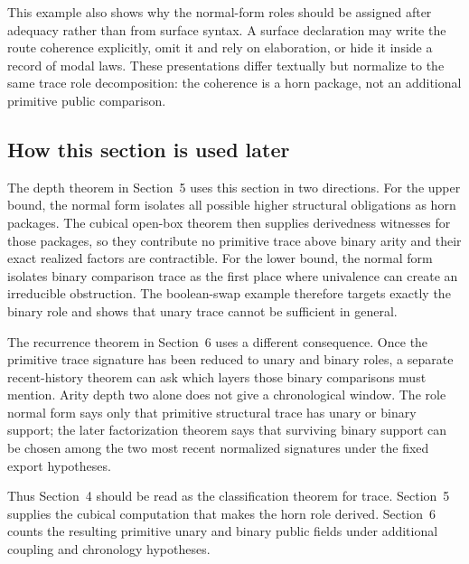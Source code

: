 This example also shows why the normal-form roles should be assigned after adequacy rather
than from surface syntax.  A surface declaration may write the route coherence explicitly,
omit it and rely on elaboration, or hide it inside a record of modal laws.  These
presentations differ textually but normalize to the same trace role decomposition: the
coherence is a horn package, not an additional primitive public comparison.

\subsection{How this section is used later}

The depth theorem in Section~5 uses this section in two directions.  For the upper bound,
the normal form isolates all possible higher structural obligations as horn packages.  The
cubical open-box theorem then supplies derivedness witnesses for those packages, so they
contribute no primitive trace above binary arity and their exact realized factors are
contractible.  For the lower bound, the normal form isolates binary comparison trace as the
first place where univalence can create an irreducible obstruction.  The boolean-swap example
therefore targets exactly the binary role and shows that unary trace cannot be sufficient in
general.

The recurrence theorem in Section~6 uses a different consequence.  Once the primitive trace
signature has been reduced to unary and binary roles, a separate recent-history theorem can
ask which layers those binary comparisons must mention.  Arity depth two alone does not give
a chronological window.  The role normal form says only that primitive structural trace has
unary or binary support; the later factorization theorem says that surviving binary support
can be chosen among the two most recent normalized signatures under the fixed export
hypotheses.

Thus Section~4 should be read as the classification theorem for trace.  Section~5 supplies
the cubical computation that makes the horn role derived.  Section~6 counts the resulting
primitive unary and binary public fields under additional coupling and chronology hypotheses.
